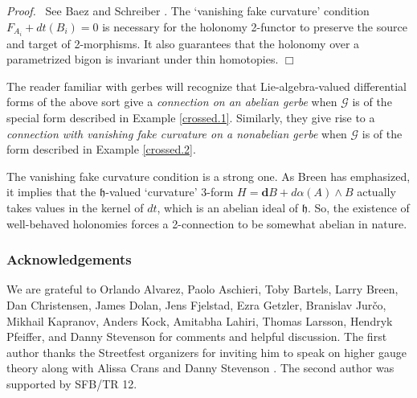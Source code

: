 \documentclass{article}
\newcommand{\h}{\mathfrak{h}}
\def\twogroup {\mathcal{G}}
\def\endofproof {\hfill$\Box$\newline}
\newcommand\Proof{\noindent\emph{Proof.}\ }
\def\of #1{\!\left({#1}\right)}
\def\extd {\mathbf{{d}}}
\begin{document}
\Proof 
See Baez and Schreiber \cite{BaezSchreiber:2004}.
The `vanishing fake curvature' condition $F_{A_i} + dt\of{B_i} = 0$ 
is necessary for the holonomy 2-functor to preserve the source and
target of 2-morphisms.  It also guarantees that the holonomy over a
parametrized bigon is invariant under thin homotopies. 
\endofproof

The reader familiar with gerbes will recognize that Lie-algebra-valued
differential forms of the above sort give a \emph{connection on an
abelian gerbe} when $\twogroup$ is of the special form described in
Example \ref{crossed.1}.  Similarly, they give rise to a \emph{connection
with vanishing fake curvature on a nonabelian gerbe} when $\twogroup$
is of the form described in Example \ref{crossed.2}.

The vanishing fake curvature condition is a strong one.  As Breen has
emphasized, it implies that the $\h$-valued `curvature' 3-form $H =
\extd B + d\alpha(A) \wedge B$ actually takes values in the kernel of
$dt$, which is an abelian ideal of $\h$.  So, the existence of
well-behaved holonomies forces a 2-connection to be somewhat abelian
in nature.

\subsubsection*{Acknowledgements}

We are grateful to
Orlando Alvarez,
Paolo Aschieri,
Toby Bartels,
Larry Breen,
Dan Christensen,
James Dolan,
Jens Fjelstad,
Ezra Getzler,
Branislav Jur{\v c}o,
Mikhail Kapranov,
Anders Kock,
Amitabha Lahiri,
Thomas Larsson,
Hendryk Pfeiffer,
and 
Danny Stevenson
for comments and helpful discussion. 
The first author thanks the Streetfest organizers for inviting
him to speak on higher gauge theory along with Alissa Crans and
Danny Stevenson \cite{BCS}.
The second author was supported by SFB/TR 12.
\end{document}
